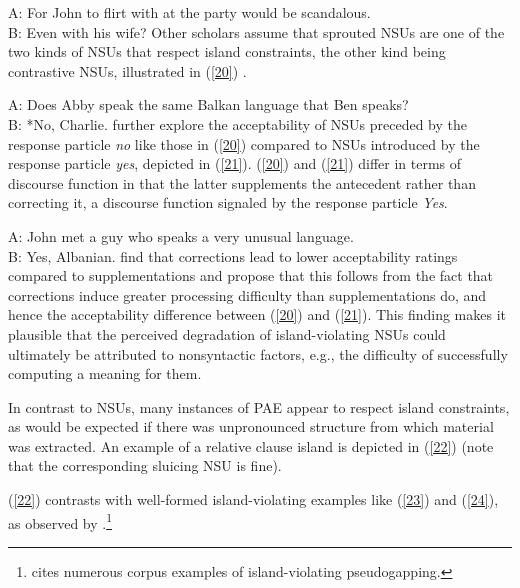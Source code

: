 {\ea A: For John to flirt with at the party would be scandalous. \\B: Even with his wife?\label{19}\z
Other scholars assume that sprouted NSUs are one of the two kinds of NSUs that respect island constraints, the other kind being contrastive NSUs, illustrated in (\ref{20}) \citep{Chung1995, Merchant2001, Griffiths2014}.

\ea A: Does Abby speak the same Balkan language that Ben speaks?\\
B: *No, Charlie. \citep{Merchant2001}  \label{20}\z
%
\citet{Schmeh2015} further explore the acceptability of NSUs preceded by the response particle \textit{no} like those in (\ref{20}) compared to NSUs introduced by the response particle \textit{yes}, depicted in (\ref{21}). (\ref{20}) and (\ref{21}) differ in terms of discourse function in that the latter supplements the antecedent rather than correcting it, a discourse function signaled by the response particle \textit{Yes}.

\ea A: John met a guy who speaks a very unusual language. \\B: Yes, Albanian. \citep[245]{CJ2005a} \label{21}\z
%
\citet{Schmeh2015} find that corrections lead to
lower acceptability ratings compared to supplementations and propose that this follows from the fact that corrections induce greater processing difficulty than supplementations do, and hence the acceptability difference between (\ref{20}) and (\ref{21}). This finding makes it plausible that the perceived degradation of island-violating NSUs could ultimately be attributed to nonsyntactic factors, e.g., the difficulty of successfully computing a meaning for them.

In contrast to NSUs, many instances of PAE appear to respect island constraints, as would be expected if there was unpronounced structure from which material was extracted. An example of a relative clause island is depicted in (\ref{22}) (note that the corresponding sluicing NSU  is fine).


\z
(\ref{22}) contrasts with well-formed island-violating examples like (\ref{23}) and (\ref{24}), as observed by \citet{Miller2014, Ginzburg2018}.\footnote{\citet{Miller2014} cites numerous corpus examples of island-violating pseudogapping.}
%
%
\eal
{}

}
